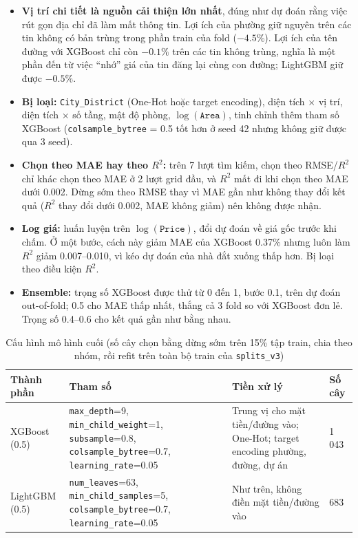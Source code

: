 \documentclass[11pt]{article}
\begin{document}
\begin{itemize}
    \item \textbf{Vị trí chi tiết là nguồn cải thiện lớn nhất}, đúng như dự đoán rằng việc rút gọn địa chỉ đã
          làm mất thông tin. Lợi ích của phường giữ nguyên trên các tin không có bản trùng trong phần train của
          fold ($-4.5\%$). Lợi ích của tên đường với XGBoost chỉ còn $-0.1\%$ trên các tin không trùng, nghĩa là
          một phần đến từ việc ``nhớ'' giá của tin đăng lại cùng con đường; LightGBM giữ được $-0.5\%$.
    \item \textbf{Bị loại:} \texttt{City\_District} (One-Hot hoặc target encoding), diện tích $\times$ vị trí,
          diện tích $\times$ số tầng, mật độ phòng, $\log(\texttt{Area})$, tinh chỉnh thêm tham số XGBoost
          (\texttt{colsample\_bytree} = 0.5 tốt hơn ở seed 42 nhưng không giữ được qua 3 seed).
    \item \textbf{Chọn theo MAE hay theo $R^2$:} trên 7 lượt tìm kiếm, chọn theo RMSE/$R^2$ chỉ khác chọn theo MAE ở 2
          lượt grid đầu, và $R^2$ mất đi khi chọn theo MAE dưới 0.002. Dừng sớm theo RMSE thay vì MAE gần như không
          thay đổi kết quả ($R^2$ thay đổi dưới 0.002, MAE không giảm) nên không được nhận.
    \item \textbf{Log giá:} huấn luyện trên $\log(\texttt{Price})$, đổi dự đoán về giá gốc trước khi chấm. Ở một
          bước, cách này giảm MAE của XGBoost 0.37\% nhưng luôn làm $R^2$ giảm 0.007--0.010, vì kéo dự đoán của
          nhà đắt xuống thấp hơn. Bị loại theo điều kiện $R^2$.
    \item \textbf{Ensemble:} trọng số XGBoost được thử từ 0 đến 1, bước 0.1, trên dự đoán out-of-fold; 0.5 cho MAE
          thấp nhất, thắng cả 3 fold so với XGBoost đơn lẻ. Trọng số 0.4--0.6 cho kết quả gần như bằng nhau.
\end{itemize}

\begin{table}[H]
\centering
\small
\caption{Cấu hình mô hình cuối (số cây chọn bằng dừng sớm trên 15\% tập train, chia theo nhóm, rồi refit trên toàn bộ train của \texttt{splits\_v3})}
\begin{tabular}{@{}L{0.14\textwidth}L{0.39\textwidth}L{0.30\textwidth}L{0.07\textwidth}@{}}
\toprule
\textbf{Thành phần} & \textbf{Tham số} & \textbf{Tiền xử lý} & \textbf{Số cây} \\
\midrule
XGBoost (0.5) & \texttt{max\_depth}=9, \texttt{min\_child\_weight}=1, \texttt{subsample}=0.8, \texttt{colsample\_bytree}=0.7, \texttt{learning\_rate}=0.05 & Trung vị cho mặt tiền/đường vào; One-Hot; target encoding phường, đường, dự án & 1\,043 \\
LightGBM (0.5) & \texttt{num\_leaves}=63, \texttt{min\_child\_samples}=5, \texttt{colsample\_bytree}=0.7, \texttt{learning\_rate}=0.05 & Như trên, không điền mặt tiền/đường vào & 683 \\
\bottomrule
\end{tabular}
\end{table}
\end{document}
